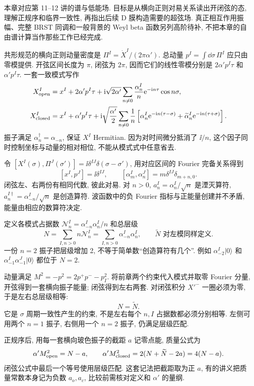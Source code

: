 本章对应第 11--12 讲的谱与低能场. 目标是从横向正则对易关系读出开闭弦的态, 理解正规序和临界一致性, 再指出后续 D 膜构造需要的超弦场. 真正相互作用振幅、完整 BRST 同调和一般背景的 Weyl beta 函数另列高阶待补, 不把本章的自由谱计算当作那些工作已经完成.

共形规范的横向正则动量密度是 $\Pi^I=\dot X^I/(2\pi\alpha')$. 总动量 $p^I=\int\dd\sigma\,\Pi^I$ 应只由零模提供. 开弦区间长度为 $\pi$, 闭弦为 $2\pi$, 因而它们的线性零模分别是 $2\alpha'p^I\tau$ 和 $\alpha'p^I\tau$. 一套一致模式写作
\begin{align*}
X^I_{\rm open}&=x^I+2\alpha'p^I\tau
+\mathrm i\sqrt{2\alpha'}\sum_{n\ne0}\frac{\alpha_n^I}{n}
\mathrm e^{-\mathrm i n\tau}\cos n\sigma,\\
X^I_{\rm closed}&=x^I+\alpha'p^I\tau
+\mathrm i\sqrt{\frac{\alpha'}2}\sum_{n\ne0}\frac1n
\left[\alpha_n^I\mathrm e^{-\mathrm i n(\tau-\sigma)}+
\widetilde\alpha_n^I\mathrm e^{-\mathrm i n(\tau+\sigma)}\right].
\end{align*}
振子满足 $\alpha_n^\dagger=\alpha_{-n}$, 保证 $X^I$ Hermitian. 因为对时间微分抵消了 $\ii/n$, 这个因子同时控制坐标与动量的相对相位, 不能从模式式中任意省去.

令 $[X^I(\sigma),\Pi^J(\sigma')]=\ii\delta^{IJ}\delta(\sigma-\sigma')$, 用对应区间的 Fourier 完备关系得到
\[
[x^I,p^J]=\ii\delta^{IJ},\qquad
[\alpha_m^I,\alpha_n^J]=m\delta^{IJ}\delta_{m+n,0}.
\]
闭弦左、右两份有相同代数, 彼此对易. 对 $n>0$, $a_n^I=\alpha_n^I/\sqrt n$ 是湮灭算符, $a_n^{I\dagger}=\alpha_{-n}^I/\sqrt n$ 是创造算符. 波函数中的负 Fourier 指标与正能量创建并不矛盾, 能量由相应的数算符决定.

定义各模式占据数 $\mathcal N_n^I=\alpha_{-n}^I\alpha_n^I/n$ 和总层级
\[
N=\sum_{I,n>0}n\mathcal N_n^I
=\sum_{I,n>0}\alpha_{-n}^I\alpha_n^I,
\qquad \widetilde N\text{ 对左模同样定义}.
\]
一份 $n=2$ 振子把层级增加 2, 不等于简单数“创造算符有几个”. 例如 $\alpha_{-2}^I|0\rangle$ 和 $\alpha_{-1}^I\alpha_{-1}^J|0\rangle$ 都位于 $N=2$.

动量满足 $M^2=-p^2=2p^+p^--p_I^2$. 将前章两个约束代入模式并取零 Fourier 分量, 开弦得到一套横向振子能量; 闭弦得到左右两套. 对闭弦积分 $X'^-$ 一圈必须为零, 于是左右总层级相等:
\[
N=\widetilde N.
\]
它是 $\sigma$ 周期一致性产生的约束, 不是左右每个 $n,I$ 占据数都必须分别相等. 左侧可用两个 $n=1$ 振子, 右侧用一个 $n=2$ 振子, 仍满足层级匹配.

正规序后, 用每一套横向玻色振子的截距 $a$ 记零点能, 质量公式为
\[
\alpha'M^2_{\rm open}=N-a,
\qquad
\alpha'M^2_{\rm closed}=2(N+\widetilde N-2a)=4(N-a).
\]
闭弦公式中最后一个等号使用层级匹配. 这套记法把截距取为正 $a$, 有的讲义把质量常数本身记为负数 $a_o,a_c$, 比较前需核对定义和 $\alpha'$ 的量纲.

